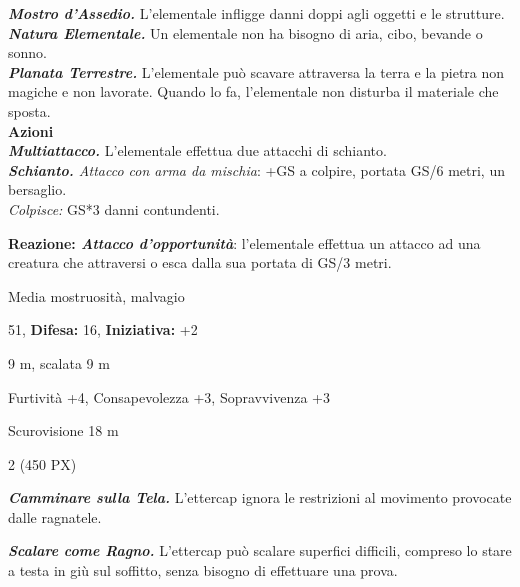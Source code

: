 \begin{multicols}{2}
{\emph{\textbf{Mostro d'Assedio.}} L'elementale infligge danni doppi agli oggetti e le strutture.\\
\emph{\textbf{Natura Elementale.}} Un elementale non ha bisogno di aria, cibo, bevande o sonno.\\
\emph{\textbf{Planata Terrestre.}} L'elementale può scavare attraversa la terra e la pietra non magiche e non lavorate. Quando lo fa, l'elementale non disturba il materiale che sposta.\\
\textbf{Azioni}\\
\emph{\textbf{Multiattacco.}} L'elementale effettua due attacchi di schianto.\\
\emph{\textbf{Schianto.} Attacco con arma da mischia}: +GS a colpire, portata GS/6 metri, un bersaglio.\\
\emph{Colpisce:} GS*3 danni contundenti.

\textbf{Reazione: \emph{Attacco d'opportunità}}: l'elementale effettua un attacco ad una creatura che attraversi o esca dalla sua portata di GS/3 metri.


\noindent
\begin{description}[noitemsep, topsep=0pt, parsep=0pt, partopsep=0pt, leftmargin=0cm, labelwidth=2.2cm]
	\item[\textbf{Taglia/Tipo:}] Media mostruosità, malvagio
	\item[\textbf{Caratt.:}] 
	\item[\textbf{Punti Ferita:}] 51,  \textbf{Difesa:} 16,  \textbf{Iniziativa:} +2
	\item[\textbf{Movimento:}] 9 m, scalata 9 m
	\item[\textbf{Tiri Salvez.:}] 
	\item[\textbf{Comp.:}] Furtività +4, Consapevolezza +3, Sopravvivenza +3
	\item[\textbf{Sensi:}] Scurovisione 18 m
	\item[\textbf{Sfida:}] 2 (450 PX)\smallskip
\end{description}

\emph{\textbf{Camminare sulla Tela.}} L'ettercap ignora le restrizioni al movimento provocate dalle ragnatele.

\emph{\textbf{Scalare come Ragno.}} L'ettercap può scalare superfici difficili, compreso lo stare a testa in giù sul soffitto, senza bisogno di effettuare una prova.

}
\end{multicols}
